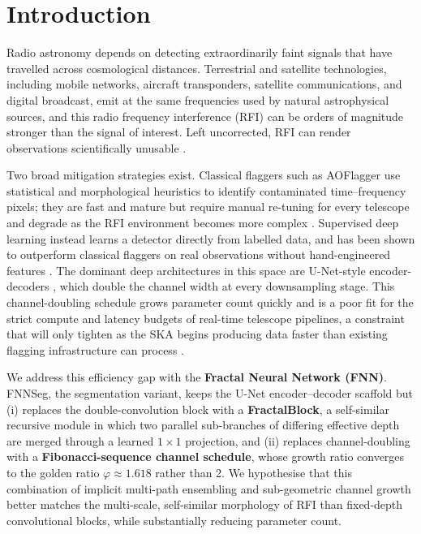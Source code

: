 \documentclass[11pt]{article}
\begin{document}
\section{Introduction}

Radio astronomy depends on detecting extraordinarily faint signals that have travelled across cosmological distances. Terrestrial and satellite technologies, including mobile networks, aircraft transponders, satellite communications, and digital broadcast, emit at the same frequencies used by natural astrophysical sources, and this radio frequency interference (RFI) can be orders of magnitude stronger than the signal of interest. Left uncorrected, RFI can render observations scientifically unusable \citep{baan2004}.

Two broad mitigation strategies exist. Classical flaggers such as AOFlagger \citep{offringa2012} use statistical and morphological heuristics to identify contaminated time--frequency pixels; they are fast and mature but require manual re-tuning for every telescope and degrade as the RFI environment becomes more complex \citep{offringa2010}. Supervised deep learning instead learns a detector directly from labelled data, and has been shown to outperform classical flaggers on real observations without hand-engineered features \citep{vafaeisadr2020,gu2024}. The dominant deep architectures in this space are U-Net-style encoder-decoders \citep{ronneberger2015,dutoit2023}, which double the channel width at every downsampling stage. This channel-doubling schedule grows parameter count quickly and is a poor fit for the strict compute and latency budgets of real-time telescope pipelines, a constraint that will only tighten as the SKA begins producing data faster than existing flagging infrastructure can process \citep{sclocco2020}.

We address this efficiency gap with the \textbf{Fractal Neural Network (FNN)}. FNNSeg, the segmentation variant, keeps the U-Net encoder--decoder scaffold but (i) replaces the double-convolution block with a \textbf{FractalBlock}, a self-similar recursive module in which two parallel sub-branches of differing effective depth are merged through a learned $1\times1$ projection, and (ii) replaces channel-doubling with a \textbf{Fibonacci-sequence channel schedule}, whose growth ratio converges to the golden ratio $\varphi \approx 1.618$ rather than 2. We hypothesise that this combination of implicit multi-path ensembling and sub-geometric channel growth better matches the multi-scale, self-similar morphology of RFI than fixed-depth convolutional blocks, while substantially reducing parameter count.
\end{document}
